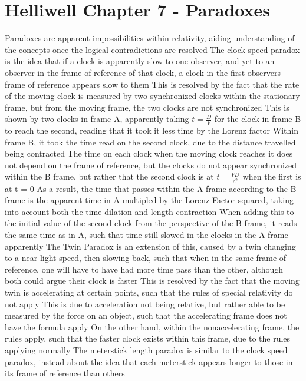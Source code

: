 \documentclass[11 pt, twoside]{article}
\newenvironment{outline*}
{
	\begin{outline}[enumerate]
	}
	{\end{outline}
}
\begin{document}
\section{Helliwell Chapter 7 - Paradoxes}
\begin{outline*}
\1 Paradoxes are apparent impossibilities within relativity, aiding understanding of the concepts once the logical contradictions are resolved
\1 The clock speed paradox is the idea that if a clock is apparently slow to one observer, and yet to an observer in the frame of reference of that clock, a clock in the first observers frame of reference appears slow to them
\2 This is resolved by the fact that the rate of the moving clock is measured by two synchronized clocks within the stationary frame, but from the moving frame, the two clocks are not synchronized
\2 This is shown by two clocks in frame A, apparently taking $t = \frac{D}{V}$ for the clock in frame B to reach the second, reading that it took it less time by the Lorenz factor
\3 Within frame B, it took the time read on the second clock, due to the distance travelled being contracted
\3 The time on each clock when the moving clock reaches it does not depend on the frame of reference, but the clocks do not appear synchronized within the B frame, but rather that the second clock is at $t = \frac{VD}{c^2}$ when the first is at t = 0
\3 As a result, the time that passes within the A frame according to the B frame is the apparent time in A multipled by the Lorenz Factor squared, taking into account both the time dilation and length contraction
\4 When adding this to the initial value of the second clock from the perspective of the B frame, it reads the same time as in A, such that time still slowed in the clocks in the A frame apparently
\2 The Twin Paradox is an extension of this, caused by a twin changing to a near-light speed, then slowing back, such that when in the same frame of reference, one will have to have had more time pass than the other, although both could argue their clock is faster
\3 This is resolved by the fact that the moving twin is accelerating at certain points, such that the rules of special relativity do not apply
\4 This is due to acceleration not being relative, but rather able to be measured by the force on an object, such that the accelerating frame does not have the formula apply
\3 On the other hand, within the nonaccelerating frame, the rules apply, such that the faster clock exists within this frame, due to the rules applying normally
\1 The meterstick length paradox is similar to the clock speed paradox, instead about the idea that each meterstick appears longer to those in its frame of reference than others

\end{outline*}
\end{document}
